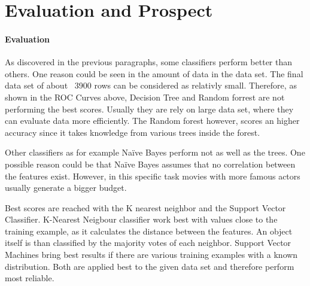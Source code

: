 \section{Evaluation and Prospect}
\paragraph{Evaluation}

\label{cha:prospect}

As discovered in the previous paragraphs, some classifiers perform better than others. One reason could be seen in the amount of data in the data set. The final data set of about ~3900 rows can be considered as relativly small. Therefore, as shown in the ROC Curves above, Decision Tree and Random forrest are not performing the best scores. Usually they are rely on large data set, where they can evaluate data more efficiently. The Random forest however, scores an higher accuracy since it takes knowledge from various trees inside the forest.



Other classifiers as for example Na\"{i}ve Bayes perform not as well as the trees. One possible reason could be that Na\"{i}ve Bayes assumes that no correlation between the features exist. However, in this specific task movies with more famous actors usually generate a bigger budget. 

Best scores are reached with the K nearest neighbor and the Support Vector Classifier. K-Nearest Neigbour classifier work best with values close to the training example, as it calculates the distance between the features. An object itself is than classified by the majority votes of each neighbor.
Support Vector Machines bring best results if there are various training examples with a known distribution. Both are applied best to the given data set and therefore perform most reliable.








